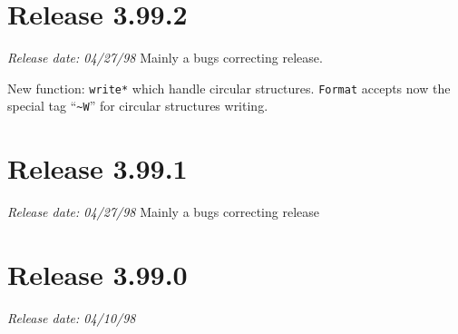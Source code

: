 \section*{Release 3.99.2}
\small{\emph{Release date: 04/27/98}}
Mainly a bugs correcting release.

New function: \texttt{write*} which handle circular structures. \texttt{Format}
accepts now the special tag ``\verb+~W+'' for circular structures writing.

\section*{Release 3.99.1}
\small{\emph{Release date: 04/27/98}}
Mainly a bugs correcting release

\section*{Release 3.99.0}
\small{\emph{Release date: 04/10/98}}

